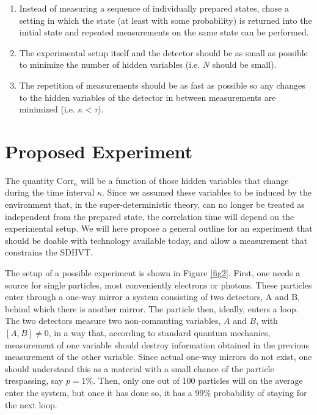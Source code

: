 \documentclass{svjour2}                    %
\begin{document}
\begin{enumerate}
\item Instead of measuring a sequence of individually prepared states, chose a setting
in which the state (at least with some probability) is returned into the initial state
and repeated measurements on the same state can be performed. 
\item The experimental setup itself and the detector should be as small as
possible to minimize the number of hidden variables (i.e. $N$ should be small). 
\item The repetition of measurements should be as fast as possible so any
changes to the hidden variables of the detector in between measurements are minimized (i.e. $\kappa < \tau$).
\end{enumerate}

\section{Proposed Experiment}

The quantity ${\mathrm{Corr}}_\kappa$ will be a function of those hidden 
variables that change during the time interval $\kappa$. Since we assumed
these variables to be induced by the environment that, in the super-deterministic
theory, can no longer be treated as independent from the prepared state,
the correlation time will depend on the experimental setup. We will here
propose a general outline for an experiment that should be doable with
technology available today, and allow a measurement that constrains 
the {\sc SDHVT}.

The setup of a possible experiment is shown in Figure \ref{fig2}. First, one
needs a source for single particles, most conveniently electrons or photons. These
particles enter through a one-way mirror a system consisting of two 
detectors, A and B, behind which there is another mirror. The particle
then, ideally, enters a loop. The two detectors 
measure two non-commuting variables, $A$ and $B$, with $[A,B] \neq 0$, in 
a way that, according to standard quantum mechanics, measurement of one variable should 
destroy information obtained in the previous
measurement of the other variable. Since actual one-way mirrors do not exist, one should understand this as 
a material with a small chance of the particle trespassing, say $p=1\%$. Then, only
one out of 100 particles will on the average enter the system, but once it has
done so, it has a 99\% probability of staying for the next loop.


\end{document}
